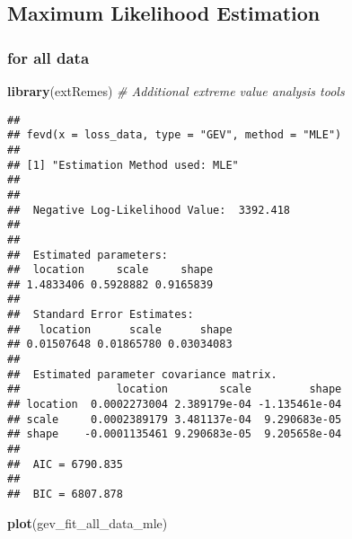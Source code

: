 \documentclass[
  12pt,
]{article}
\newenvironment{Shaded}{\begin{snugshade}}{\end{snugshade}}
\newcommand{\AttributeTok}[1]{\textcolor[rgb]{0.13,0.29,0.53}{#1}}
\newcommand{\CommentTok}[1]{\textcolor[rgb]{0.56,0.35,0.01}{\textit{#1}}}
\newcommand{\FunctionTok}[1]{\textcolor[rgb]{0.13,0.29,0.53}{\textbf{#1}}}
\newcommand{\NormalTok}[1]{#1}
\newcommand{\OtherTok}[1]{\textcolor[rgb]{0.56,0.35,0.01}{#1}}
\newcommand{\SpecialCharTok}[1]{\textcolor[rgb]{0.81,0.36,0.00}{\textbf{#1}}}
\newcommand{\StringTok}[1]{\textcolor[rgb]{0.31,0.60,0.02}{#1}}
\begin{document}
\subsection{Maximum Likelihood
Estimation}\label{maximum-likelihood-estimation}

\subsubsection{for all data}\label{for-all-data}

\begin{Shaded}
\begin{Highlighting}[]
\FunctionTok{library}\NormalTok{(extRemes)    }\CommentTok{\# Additional extreme value analysis tools}
\end{Highlighting}
\end{Shaded}

\begin{Shaded}
\end{Shaded}

\begin{verbatim}
## 
## fevd(x = loss_data, type = "GEV", method = "MLE")
## 
## [1] "Estimation Method used: MLE"
## 
## 
##  Negative Log-Likelihood Value:  3392.418 
## 
## 
##  Estimated parameters:
##  location     scale     shape 
## 1.4833406 0.5928882 0.9165839 
## 
##  Standard Error Estimates:
##   location      scale      shape 
## 0.01507648 0.01865780 0.03034083 
## 
##  Estimated parameter covariance matrix.
##               location        scale         shape
## location  0.0002273004 2.389179e-04 -1.135461e-04
## scale     0.0002389179 3.481137e-04  9.290683e-05
## shape    -0.0001135461 9.290683e-05  9.205658e-04
## 
##  AIC = 6790.835 
## 
##  BIC = 6807.878
\end{verbatim}

\begin{Shaded}
\begin{Highlighting}[]
\FunctionTok{plot}\NormalTok{(gev\_fit\_all\_data\_mle)}
\end{Highlighting}
\end{Shaded}
\end{document}
